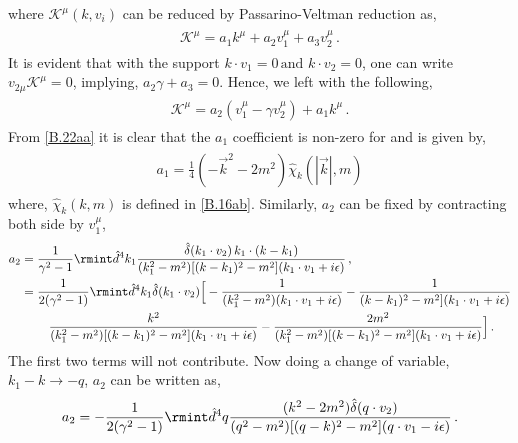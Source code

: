 where $\mathcal{K}^{\mu}(k,v_i)$ can be reduced by Passarino-Veltman reduction as,
\begin{align}
    \begin{split}
        \mathcal{K}^{\mu}=a_1 k^{\mu}+a_2 v_1^{\mu}+a_3 v_2^{\mu}\,.\label{4.38a}
    \end{split}
\end{align}
It is evident that with the support $k\cdot v_1 =0\,\text{and } k\cdot v_2=0$, one can write $ v_{2\mu}\mathcal{K}^{\mu}=0$, implying, $a_2\gamma+a_3=0$. Hence, we left with the following,
\begin{align}
    \begin{split}
\mathcal{K}^{\mu}=a_2(v_1^{\mu}-\gamma v_2^{\mu})+a_1k^\mu\,.
    \end{split}
\end{align}
From \eqref{B.22aa} it is clear that the $a_1$ coefficient is non-zero for %
and is given by,
\begin{align}
    \begin{split}
     a_1=   \frac{1}{4}(-\vec k^2-2m^2)\hat\chi_k(|\vec k|,m)
    \end{split}
\end{align}
where, $\hat\chi_{k}(k,m)$ is defined in \eqref{B.16ab}. Similarly,
$a_2$ can be fixed by contracting both side by $v_1^{\mu}$,
\begin{align}
    \begin{split}
        a_2&=\frac{1}{\gamma^2-1}\rmint \hat d^{4}k_1 \frac{\hat\delta(k_1\cdot v_2)\,k_1\cdot(k-k_1)}{(k_1^2-m^2)[(k-k_1)^2-m^2](k_1\cdot v_1+i\epsilon)}\,,\\ &
        =\frac{1}{2(\gamma^2-1)}\rmint \hat d^4 k_1\hat\delta(k_1\cdot v_2)\Big[-\frac{1}{(k_1^2-m^2)(k_1\cdot v_1+i\epsilon)}-\frac{1}{(k-k_1)^2-m^2](k_1\cdot v_1+i\epsilon)}\\\ &
        \hspace{0.8cm} \frac{k^2}{(k_1^2-m^2)[(k-k_1)^2-m^2](k_1\cdot v_1+i\epsilon)}
      -\frac{2m^2}{(k_1^2-m^2)[(k-k_1)^2-m^2](k_1\cdot v_1+i\epsilon)}  \Big]\,.\label{3.13}
    \end{split}
\end{align}
The first two terms will not contribute. Now doing a change of variable, $k_1-k\rightarrow -q$, $a_2$ can be written as,
\begin{align}
    \begin{split}
        a_2=-\frac{1}{2(\gamma^2-1)}\rmint \hat d^4q \frac{(k^2-2m^2)\hat\delta(q\cdot v_2)}{(q^2-m^2)[(q-k)^2-m^2](q\cdot v_1-i\epsilon)}\,.\label{3.14}
    \end{split}
\end{align}
